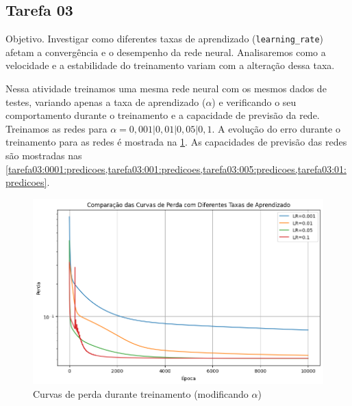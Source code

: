 \subsection{Tarefa 03}

\begin{comandoquestao}
Objetivo. Investigar como diferentes taxas de aprendizado 
(\texttt{learning\_rate}) afetam a 
convergência e o desempenho da rede neural. Analisaremos como a velocidade e a 
estabilidade do treinamento variam com a alteração dessa taxa.
\end{comandoquestao}

Nessa atividade treinamos uma mesma rede neural com os mesmos dados de testes, 
variando apenas a taxa de aprendizado ($\alpha$) e verificando o seu 
comportamento durante 
o treinamento e a capacidade de previsão da rede. Treinamos as redes para 
$\alpha = 0,001 | 0,01 | 0,05 | 0,1$. A evolução do erro durante o treinamento 
para as redes é mostrada na \cref{tarefa03:tabela:curvas}. As 
capacidades de previsão das redes são mostradas nas 
\cref{tarefa03:0001:predicoes,tarefa03:001:predicoes,tarefa03:005:predicoes,tarefa03:01:predicoes}.

\begin{figure}[tbh]
	\centering
	\caption{Curvas de perda durante treinamento (modificando $\alpha$)}
	\label{tarefa03:tabela:curvas}
	\includegraphics[width=0.7\linewidth]{./0803_imgs/png-241110-180530307-18269409044321663699.png}
\end{figure}


